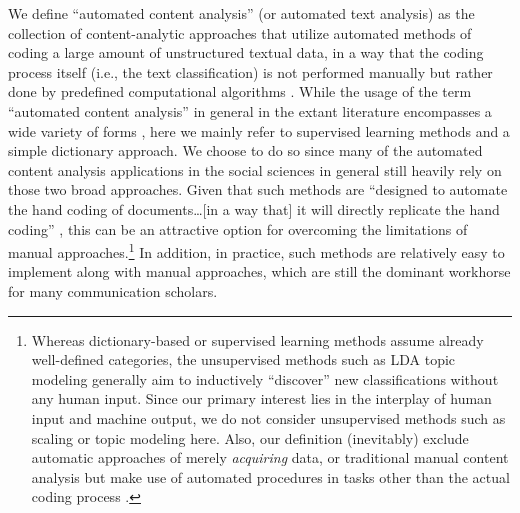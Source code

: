 \documentclass[man, 12pt, a4paper, nolmodern, noextraspace]{apa6}
\begin{document}
    We define \enquote{automated content analysis} (or automated text analysis) as the collection of content-analytic approaches that utilize automated methods of coding a large amount of unstructured textual data, in a way that the coding process itself (i.e., the text classification) is not performed manually but rather done by predefined computational algorithms \parencite{trilling2018scaling, grimmer2013text}. While the usage of the term \enquote{automated content analysis} in general in the extant literature encompasses a wide variety of forms \parencites[e.g.,][]{riff2014analyzing, Hopkins_King2010, Krippendorff2013, grimmer2013text}, here we mainly refer to supervised learning methods and a simple dictionary approach. We choose to do so since many of the automated content analysis applications in the social sciences in general still heavily rely on those two broad approaches. Given that such methods are \enquote{designed to automate the hand coding of documents\ldots[in a way that] it will directly replicate the hand coding} \parencites[][p. 13]{grimmer2013text}, this can be an attractive option for overcoming the limitations of manual approaches.\footnote{ Whereas dictionary-based or supervised learning methods assume already well-defined categories, the unsupervised methods such as LDA topic modeling \parencites[][]{dimaggio2013exploiting, maier2018applying} generally aim to inductively \enquote{discover} new classifications without any human input. Since our primary interest lies in the interplay of human input and machine output, we do not consider unsupervised methods such as scaling or topic modeling here. Also, our definition (inevitably) exclude automatic approaches of merely \textit{acquiring} data, or traditional manual content analysis but make use of automated procedures in tasks other than the actual coding process \parencites[such as in data entry or data management: e.g.,][]{lewis2013content}.} In addition, in practice, such methods are relatively easy to implement along with manual approaches, which are still the dominant workhorse for many communication scholars.
    
\end{document}
